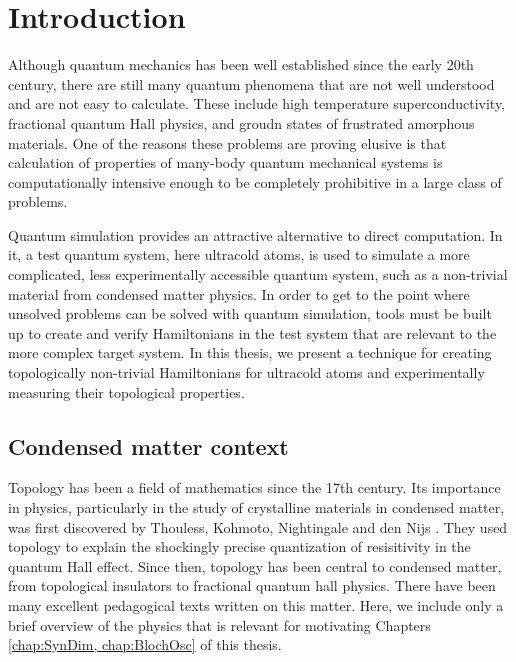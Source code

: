 \renewcommand{\thechapter}{1}

\chapter{Introduction}
Although quantum mechanics has been well established since the early 20th century, there are still many quantum phenomena that are not well understood and are not easy to calculate. These include high temperature superconductivity, fractional quantum Hall physics, and groudn states of frustrated amorphous materials. One of the reasons these problems are proving elusive is that calculation of properties of many-body quantum mechanical systems is computationally intensive enough to be completely prohibitive in a large class of problems. 

Quantum simulation provides an attractive alternative to direct computation. In it, a test quantum system, here ultracold atoms, is used to simulate a more complicated, less experimentally accessible quantum system, such as a non-trivial material from condensed matter physics. In order to get to the point where unsolved problems can be solved with quantum simulation, tools must be built up to create and verify Hamiltonians in the test system that are relevant to the more complex target system. In this thesis, we present a technique for creating topologically non-trivial Hamiltonians for ultracold atoms and experimentally measuring their topological properties.

\section{Condensed matter context}
Topology has been a field of mathematics since the 17th century. Its importance in physics, particularly in the study of crystalline materials in condensed matter, was first discovered by Thouless, Kohmoto, Nightingale and den Nijs \cite{Thouless1982}. They used topology to explain the shockingly precise quantization of resisitivity in the quantum Hall effect. Since then, topology has been central to condensed matter, from topological insulators\cite{Qi2011} to fractional quantum hall physics\cite{Stormer1999}. There have been many excellent pedagogical texts written on this matter. Here, we include only a brief overview of the physics that is relevant for motivating Chapters \ref{chap:SynDim, chap:BlochOsc} of this thesis.  

